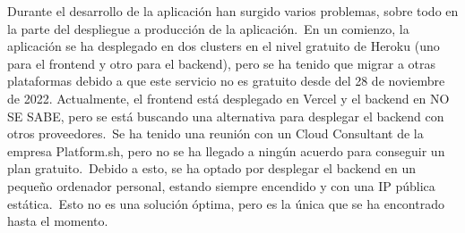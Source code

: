 
Durante el desarrollo de la aplicación han surgido varios problemas, sobre todo en la parte del despliegue a producción
de la aplicación.\ En un comienzo, la aplicación se ha desplegado en dos clusters en el nivel gratuito de Heroku (uno
para el frontend y otro para el backend), pero se ha tenido que migrar a otras plataformas debido a que este servicio
no es gratuito desde del 28 de noviembre de 2022.
Actualmente, el frontend está desplegado en Vercel y el backend en NO SE SABE, pero se está buscando una alternativa
para desplegar el backend con otros proveedores.\ Se ha tenido una reunión con un Cloud Consultant
de la empresa Platform.sh, pero no se ha llegado a ningún acuerdo para conseguir un plan gratuito.\ Debido a esto, se
ha optado por desplegar el backend en un pequeño ordenador personal, estando siempre encendido y con una IP pública
estática.\ Esto no es una solución óptima, pero es la única que se ha encontrado hasta el momento.
